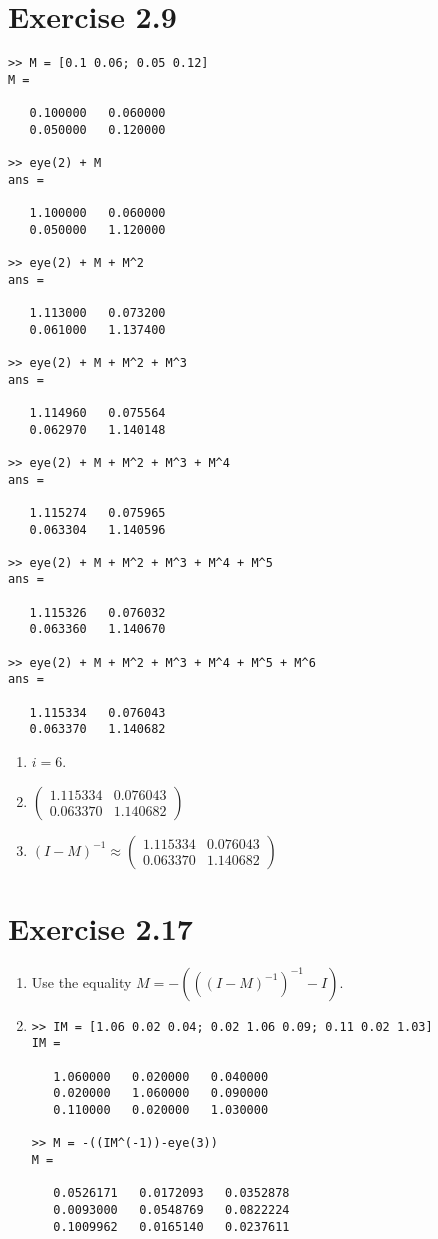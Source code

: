 \documentclass{article}
\begin{document}
\section*{Exercise 2.9}
\begin{lstlisting}
>> M = [0.1 0.06; 0.05 0.12]
M =

   0.100000   0.060000
   0.050000   0.120000

>> eye(2) + M
ans =

   1.100000   0.060000
   0.050000   1.120000

>> eye(2) + M + M^2
ans =

   1.113000   0.073200
   0.061000   1.137400

>> eye(2) + M + M^2 + M^3
ans =

   1.114960   0.075564
   0.062970   1.140148

>> eye(2) + M + M^2 + M^3 + M^4
ans =

   1.115274   0.075965
   0.063304   1.140596

>> eye(2) + M + M^2 + M^3 + M^4 + M^5
ans =

   1.115326   0.076032
   0.063360   1.140670

>> eye(2) + M + M^2 + M^3 + M^4 + M^5 + M^6
ans =

   1.115334   0.076043
   0.063370   1.140682
\end{lstlisting}
\begin{enumerate}[label=(\alph*)]
\item $i=6$. 
\item \(
    \begin{pmatrix}
   1.115334 &   0.076043 \\
   0.063370  & 1.140682
    \end{pmatrix}
\)
\item $(I-M)^{-1} \approx     \begin{pmatrix}
   1.115334 &   0.076043 \\
   0.063370  & 1.140682
    \end{pmatrix}$
\end{enumerate}

\section*{Exercise 2.17}
\begin{enumerate}[label=(\alph*)]
\item Use the equality $M = - (((I-M)^{-1})^{-1}-I)$.
\item
\begin{lstlisting}
>> IM = [1.06 0.02 0.04; 0.02 1.06 0.09; 0.11 0.02 1.03]
IM =

   1.060000   0.020000   0.040000
   0.020000   1.060000   0.090000
   0.110000   0.020000   1.030000

>> M = -((IM^(-1))-eye(3))
M =

   0.0526171   0.0172093   0.0352878
   0.0093000   0.0548769   0.0822224
   0.1009962   0.0165140   0.0237611
\end{lstlisting}
\end{enumerate}
\end{document}
